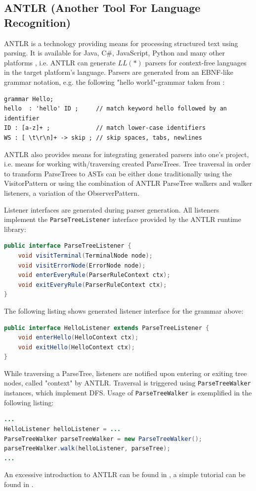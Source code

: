 \subsection{ANTLR (Another Tool For Language Recognition)}
\label{subsection:ANTLR}
\Gls{ANTLR} \cite{Parr:2013:DAR:2501720} is a technology providing means for processing structured text using parsing.
It is available for \gls{Java}, C\#, JavaScript, Python and many other platforms \cite{antlr.org}, i.e. \Gls{ANTLR} can generate $LL(*)$ parsers for context-free languages in the target platform's language.
Parsers are generated from an EBNF-like grammar notation, e.g. the following "hello world"-grammar taken from \cite{ANTLRv4GettingStarted}:
\begin{lstlisting}[numbers=none]
grammar Hello;
hello  : 'hello' ID ;     // match keyword hello followed by an identifier
ID : [a-z]+ ;             // match lower-case identifiers
WS : [ \t\r\n]+ -> skip ; // skip spaces, tabs, newlines
\end{lstlisting}

\Gls{ANTLR} also provides means for integrating generated parsers into one's project, i.e. means for working with/traversing created \glspl{ParseTree}.
Tree traversal in order to transform \glspl{ParseTree} to \glspl{AST} can be either done traditionally using the \gls{VisitorPattern} or using the combination of \gls{ANTLR} \gls{ParseTree} walkers and walker listeners, a variation of the \gls{ObserverPattern}.

Listener interfaces are generated during parser generation.
All listeners implement the \texttt{ParseTreeListener} interface provided by the \gls{ANTLR} runtime library:
\begin{lstlisting}[language=Java,numbers=none]
public interface ParseTreeListener {
	void visitTerminal(TerminalNode node);
	void visitErrorNode(ErrorNode node);
	void enterEveryRule(ParserRuleContext ctx);
	void exitEveryRule(ParserRuleContext ctx);
}
\end{lstlisting}
The following listing shows generated listener interface for the grammar above:
\begin{lstlisting}[language=Java,numbers=none]
public interface HelloListener extends ParseTreeListener {
    void enterHello(HelloContext ctx);
    void exitHello(HelloContext ctx);
}
\end{lstlisting}
While traversing a \gls{ParseTree}, listeners are notified upon entering or exiting tree nodes, called "context" by \gls{ANTLR}.
Traversal is triggered using \texttt{Parse\-Tree\-Walker} instances, which implement \gls{DFS}.
Usage of \texttt{Parse\-Tree\-Walker} is exemplified in the following listing:
\begin{lstlisting}[language=Java,numbers=none]
...
HelloListener helloListener = ...
ParseTreeWalker parseTreeWalker = new ParseTreeWalker();
parseTreeWalker.walk(helloListener, parseTree);
...
\end{lstlisting}

An excessive introduction to \gls{ANTLR} can be found in \cite{Parr:2013:DAR:2501720}, a simple tutorial can be found in \cite{ANTLRv4GettingStarted}.